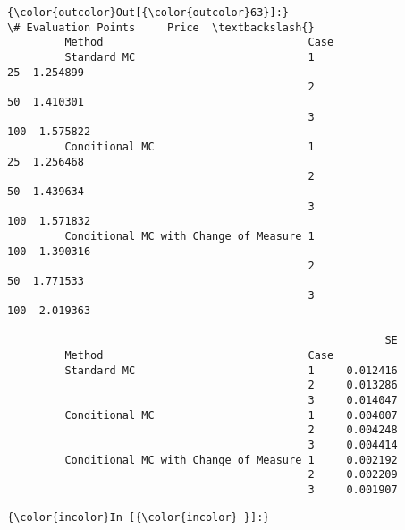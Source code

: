 \documentclass[11pt]{article}
\begin{document}
            \begin{Verbatim}[commandchars=\\\{\}]
{\color{outcolor}Out[{\color{outcolor}63}]:}                                             \# Evaluation Points     Price  \textbackslash{}
         Method                                Case                                  
         Standard MC                           1                      25  1.254899   
                                               2                      50  1.410301   
                                               3                     100  1.575822   
         Conditional MC                        1                      25  1.256468   
                                               2                      50  1.439634   
                                               3                     100  1.571832   
         Conditional MC with Change of Measure 1                     100  1.390316   
                                               2                      50  1.771533   
                                               3                     100  2.019363   
         
                                                           SE  
         Method                                Case            
         Standard MC                           1     0.012416  
                                               2     0.013286  
                                               3     0.014047  
         Conditional MC                        1     0.004007  
                                               2     0.004248  
                                               3     0.004414  
         Conditional MC with Change of Measure 1     0.002192  
                                               2     0.002209  
                                               3     0.001907  
\end{Verbatim}
        
    \begin{Verbatim}[commandchars=\\\{\}]
{\color{incolor}In [{\color{incolor} }]:} 
\end{Verbatim}


    
    
    
    
\end{document}
